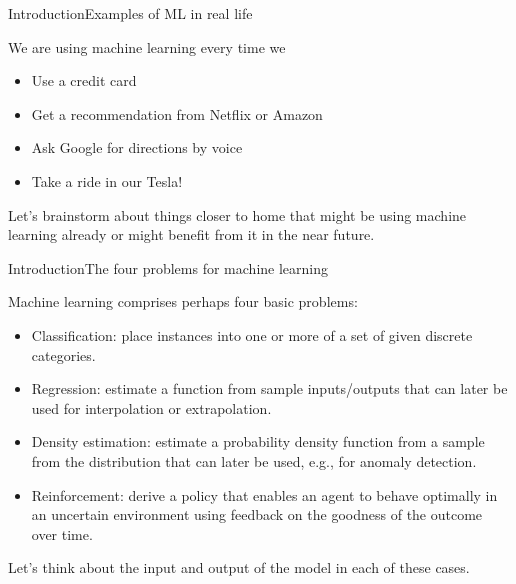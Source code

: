 \documentclass{beamer}
\begin{document}
\begin{frame}{Introduction}{Examples of ML in real life}
  
  We are using machine learning every time we
  \begin{itemize}
  \item Use a credit card
  \item Get a recommendation from Netflix or Amazon
  \item Ask Google for directions by voice
  \item Take a ride in our Tesla!
  \end{itemize}

  \medskip
  
  Let's brainstorm about things closer to home that might be using
  machine learning already or might benefit from it in the near
  future.

\end{frame}


\begin{frame}{Introduction}{The four problems for machine learning}

  Machine learning comprises perhaps four basic problems:
  \begin{itemize}
  \item \alert{Classification}: place instances into one or more of a
    set of given discrete \alert{categories}.
  \item \alert{Regression}: estimate a function from sample
    inputs/outputs that can later be used for \alert{interpolation} or
    \alert{extrapolation}.
  \item \alert{Density estimation}: estimate a probability density
    function from a sample from the distribution that can later be used,
    e.g., for \alert{anomaly detection}.
  \item \alert{Reinforcement}: derive a \alert{policy} that enables an
    agent to behave optimally in an uncertain environment using
    \alert{feedback} on the goodness of the outcome over time.
  \end{itemize}

  \medskip

  Let's think about the input and output of the model in each of these
  cases.
  
\end{frame}
\end{document}
